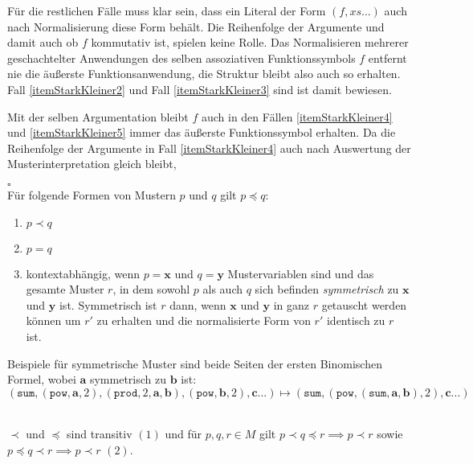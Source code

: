 Für die restlichen Fälle muss klar sein, dass ein Literal der Form $(f, xs...)$ auch nach Normalisierung diese Form behält. Die Reihenfolge der Argumente und damit auch ob $f$ kommutativ ist, spielen keine Rolle. Das Normalisieren mehrerer geschachtelter Anwendungen des selben assoziativen Funktionssymbols $f$ entfernt nie die äußerste Funktionsanwendung, die Struktur bleibt also auch so erhalten.
Fall \ref{itemStarkKleiner2} und Fall \ref{itemStarkKleiner3} sind ist damit bewiesen.

Mit der selben Argumentation bleibt $f$ auch in den Fällen \ref{itemStarkKleiner4} und \ref{itemStarkKleiner5} immer das äußerste Funktionssymbol erhalten. Da die Reihenfolge der Argumente in Fall \ref{itemStarkKleiner4} auch nach Auswertung der Musterinterpretation gleich bleibt, 

\hfill $\square$\\


Für folgende Formen von Mustern $p$ und $q$ gilt $p \preceq q$:
\begin{enumerate}
	\item{$p \prec q$}
	
	\item{$p = q$}
	
	\item{kontextabhängig, wenn $p = \mathbf x$ und $q = \mathbf y$ Mustervariablen sind und das gesamte Muster $r$, in dem sowohl $p$ als auch $q$ sich befinden \emph{symmetrisch} zu $\mathbf x$ und $\mathbf y$ ist. Symmetrisch ist $r$ dann, wenn $\mathbf x$ und $\mathbf y$ in ganz $r$ getauscht werden können um $r'$ zu erhalten und die normalisierte Form von $r'$ identisch zu $r$ ist.}
\end{enumerate}


Beispiele für symmetrische Muster sind beide Seiten der ersten Binomischen Formel, wobei $\mathbf a$ symmetrisch zu $\mathbf b$ ist:
$$(\texttt{sum}, (\texttt{pow}, \mathbf a, 2), (\texttt{prod}, 2, \mathbf a, \mathbf b), (\texttt{pow}, \mathbf b, 2), \mathbf {c...}) \mapsto (\texttt{sum}, (\texttt{pow}, (\texttt{sum}, \mathbf a, \mathbf b), 2), \mathbf {c...})$$


\begin{lemma}\label{lemTransitivStark}~\\
$\prec$ und $\preceq$ sind transitiv $(1)$ und für $p, q, r \in M$  gilt $p \prec q \preceq r \implies p \prec r$ sowie $p \preceq q \prec r \implies p \prec r$ $(2)$. 
\end{lemma}

